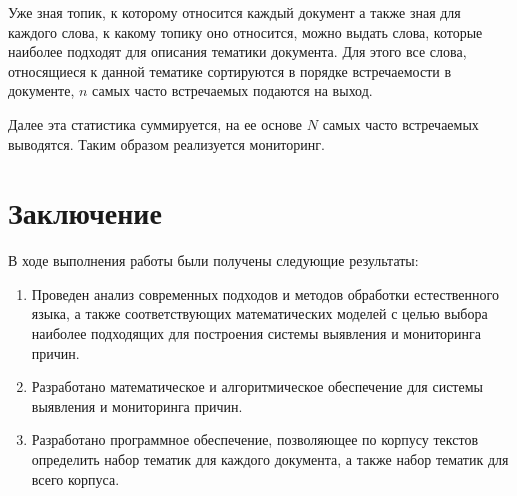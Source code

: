 \documentclass[a4paper,12pt,preview]{report} %
\begin{document}
	Уже зная топик, к которому относится каждый документ а также зная для каждого слова, к какому топику оно относится, можно выдать слова, которые наиболее подходят для описания тематики документа. Для этого все слова, относящиеся к данной тематике сортируются в порядке встречаемости в документе, $n$ самых часто встречаемых подаются на выход. 
	
	Далее эта статистика суммируется, на ее основе $N$ самых часто встречаемых выводятся. Таким образом реализуется мониторинг.
	
	
	
	
	\chapter*{Заключение}
	
	В ходе выполнения работы были получены следующие результаты:
	
	\begin{enumerate}
		\item Проведен анализ современных подходов и методов обработки естественного языка, а также соответствующих математических моделей с целью выбора наиболее подходящих для построения системы выявления и мониторинга причин.
		
		\item Разработано математическое и алгоритмическое обеспечение для системы выявления и мониторинга причин.
		
		\item Разработано программное обеспечение, позволяющее по корпусу текстов определить набор тематик для каждого документа, а также набор тематик для всего корпуса.	
		
	\end{enumerate}
	
	
	
\end{document}
